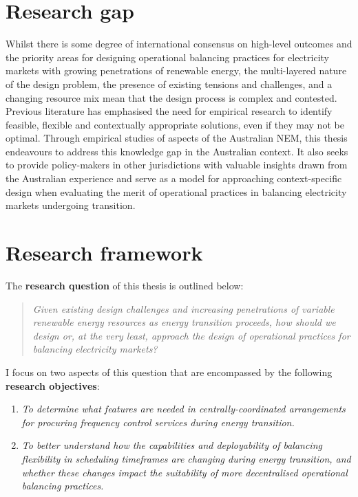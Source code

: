 \documentclass[12pt,a4paper,]{report}
\begin{document}
\hypertarget{sec:intro-research_gap}{%
\section{Research gap}\label{sec:intro-research_gap}}

Whilst there is some degree of international consensus on high-level
outcomes and the priority areas for designing operational balancing
practices for electricity markets with growing penetrations of renewable
energy, the multi-layered nature of the design problem, the presence of
existing tensions and challenges, and a changing resource mix mean that
the design process is complex and contested. Previous literature has
emphasised the need for empirical research to identify feasible,
flexible and contextually appropriate solutions, even if they may not be
optimal. Through empirical studies of aspects of the Australian NEM,
this thesis endeavours to address this knowledge gap in the Australian
context. It also seeks to provide policy-makers in other jurisdictions
with valuable insights drawn from the Australian experience and serve as
a model for approaching context-specific design when evaluating the
merit of operational practices in balancing electricity markets
undergoing transition.

\hypertarget{sec:intro-research_framework}{%
\section{Research framework}\label{sec:intro-research_framework}}

The \textbf{research question} of this thesis is outlined below:

\begin{quote}
\emph{Given existing design challenges and increasing penetrations of
variable renewable energy resources as energy transition proceeds, how
should we design or, at the very least, approach the design of
operational practices for balancing electricity markets?}
\end{quote}

I focus on two aspects of this question that are encompassed by the
following \textbf{research objectives}:

\begin{enumerate}
\def\labelenumi{\arabic{enumi}.}
\item
  \emph{To determine what features are needed in centrally-coordinated
  arrangements for procuring frequency control services during energy
  transition.}
\item
  \emph{To better understand how the capabilities and deployability of
  balancing flexibility in scheduling timeframes are changing during
  energy transition, and whether these changes impact the suitability of
  more decentralised operational balancing practices.}
\end{enumerate}
\end{document}
